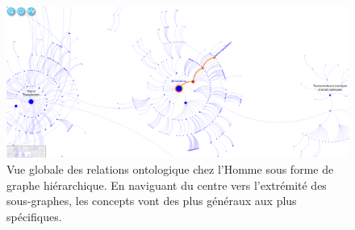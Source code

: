 \begin{refsegment}
    \begin{shadedfigure}[H]
        \begin{subfigure}[t]{.5\textwidth}
            \centering
            \includegraphics[angle=90,origin=c,width=\textwidth]{img/reactome_homo_sapiens_metabolism.png}
            \caption{ Vue globale des relations ontologique chez l'Homme sous forme de graphe hiérarchique. En naviguant du centre vers l'extrémité des sous-graphes, les concepts vont des plus généraux aux plus spécifiques. }
            \label{fig:reactome_metabolism}
        \end{subfigure}
    \hfill
    \begin{subfigure}[t]{.45\textwidth}
        \centering

\end{subfigure}
\end{shadedfigure}
\end{refsegment}
